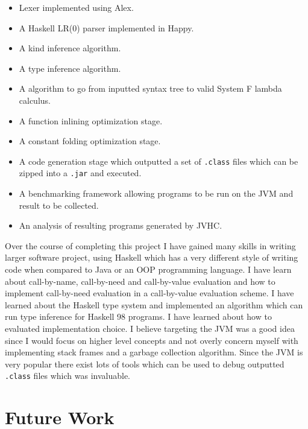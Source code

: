 \documentclass[float=false, crop=false]{standalone}
\begin{document}
\begin{itemize}

  \item Lexer implemented using Alex.

  \item A Haskell LR(0) parser implemented in Happy.

  \item A kind inference algorithm.

  \item A type inference algorithm.

  \item A algorithm to go from inputted syntax tree to valid
    System F lambda calculus.

  \item A function inlining optimization stage.

  \item A constant folding optimization stage.

  \item A code generation stage which outputted a set of \verb|.class|
    files which can be zipped into a \verb|.jar| and executed.

  \item A benchmarking framework allowing programs to be run on the JVM and 
    result to be collected.

  \item An analysis of resulting programs generated by JVHC.
\end{itemize}
Over the course of completing this project I have gained many
skills in writing larger software project, using Haskell which has a 
very different style of writing code when compared to Java or an OOP
programming language. I have learn about call-by-name, call-by-need and 
call-by-value evaluation and how to implement call-by-need evaluation
in a call-by-value evaluation scheme. I have learned about the Haskell
type system and implemented an algorithm which can run type inference
for Haskell 98 programs. I have learned about how to evaluated implementation
choice. I believe targeting the JVM was a good idea since I would focus
on higher level concepts and not overly concern myself with 
implementing stack frames and a garbage collection algorithm. 
Since the JVM is very popular there exist lots of tools which can be 
used to debug outputted \verb|.class| files which was invaluable. 


\section{Future Work}
\end{document}
